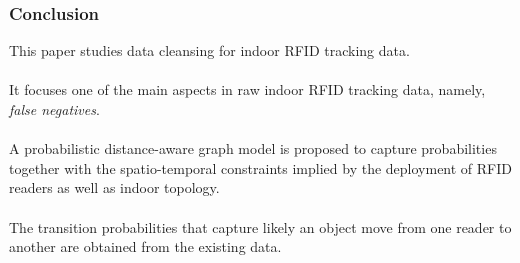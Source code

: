 
\begin{frame}
\frametitle{Conclusion}

This paper studies data cleansing for indoor RFID tracking data.\\~\\

It focuses one of the main aspects in raw indoor RFID tracking data, namely, \emph{false negatives}.\\~\\

A probabilistic distance-aware graph model is proposed to capture probabilities together with the spatio-temporal constraints implied by the deployment of RFID readers as well as indoor topology.\\~\\

The transition probabilities that capture likely an object move from one reader to another are obtained from the existing data.

\end{frame}
